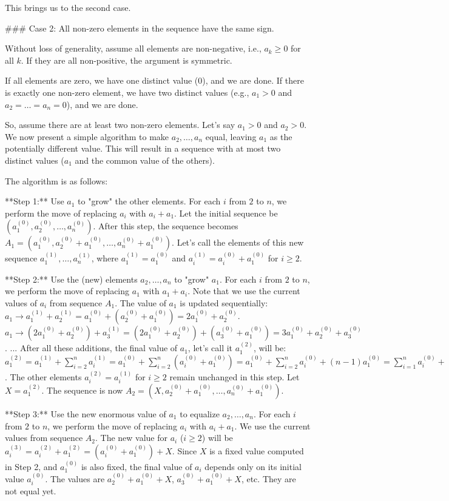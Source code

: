 This brings us to the second case.

### Case 2: All non-zero elements in the sequence have the same sign.

Without loss of generality, assume all elements are non-negative, i.e., $a_k \ge 0$ for all $k$. If they are all non-positive, the argument is symmetric.

If all elements are zero, we have one distinct value (0), and we are done.
If there is exactly one non-zero element, we have two distinct values (e.g., $a_1 > 0$ and $a_2=\dots=a_n=0$), and we are done.

So, assume there are at least two non-zero elements. Let's say $a_1 > 0$ and $a_2 > 0$. We now present a simple algorithm to make $a_2, \dots, a_n$ equal, leaving $a_1$ as the potentially different value. This will result in a sequence with at most two distinct values ($a_1$ and the common value of the others).

The algorithm is as follows:

**Step 1:** Use $a_1$ to "grow" the other elements.
For each $i$ from $2$ to $n$, we perform the move of replacing $a_i$ with $a_i+a_1$.
Let the initial sequence be $(a_1^{(0)}, a_2^{(0)}, \dots, a_n^{(0)})$.
After this step, the sequence becomes $A_1 = (a_1^{(0)}, a_2^{(0)}+a_1^{(0)}, \dots, a_n^{(0)}+a_1^{(0)})$. Let's call the elements of this new sequence $a_1^{(1)}, \dots, a_n^{(1)}$, where $a_1^{(1)}=a_1^{(0)}$ and $a_i^{(1)}=a_i^{(0)}+a_1^{(0)}$ for $i \ge 2$.

**Step 2:** Use the (new) elements $a_2, \dots, a_n$ to "grow" $a_1$.
For each $i$ from $2$ to $n$, we perform the move of replacing $a_1$ with $a_1+a_i$. Note that we use the current values of $a_i$ from sequence $A_1$.
The value of $a_1$ is updated sequentially:
$a_1 \to a_1^{(1)} + a_2^{(1)} = a_1^{(0)} + (a_2^{(0)}+a_1^{(0)}) = 2a_1^{(0)}+a_2^{(0)}$.
$a_1 \to (2a_1^{(0)}+a_2^{(0)}) + a_3^{(1)} = (2a_1^{(0)}+a_2^{(0)}) + (a_3^{(0)}+a_1^{(0)}) = 3a_1^{(0)}+a_2^{(0)}+a_3^{(0)}$.
...
After all these additions, the final value of $a_1$, let's call it $a_1^{(2)}$, will be:
$a_1^{(2)} = a_1^{(1)} + \sum_{i=2}^n a_i^{(1)} = a_1^{(0)} + \sum_{i=2}^n (a_i^{(0)} + a_1^{(0)}) = a_1^{(0)} + \sum_{i=2}^n a_i^{(0)} + (n-1)a_1^{(0)} = \sum_{i=1}^n a_i^{(0)} + (n-1)a_1^{(0)}$.
The other elements $a_i^{(2)} = a_i^{(1)}$ for $i \ge 2$ remain unchanged in this step.
Let $X = a_1^{(2)}$. The sequence is now $A_2 = (X, a_2^{(0)}+a_1^{(0)}, \dots, a_n^{(0)}+a_1^{(0)})$.

**Step 3:** Use the new enormous value of $a_1$ to equalize $a_2, \dots, a_n$.
For each $i$ from $2$ to $n$, we perform the move of replacing $a_i$ with $a_i+a_1$. We use the current values from sequence $A_2$.
The new value for $a_i$ ($i \ge 2$) will be $a_i^{(3)} = a_i^{(2)} + a_1^{(2)} = (a_i^{(0)}+a_1^{(0)}) + X$.
Since $X$ is a fixed value computed in Step 2, and $a_1^{(0)}$ is also fixed, the final value of $a_i$ depends only on its initial value $a_i^{(0)}$.
The values are $a_2^{(0)}+a_1^{(0)}+X$, $a_3^{(0)}+a_1^{(0)}+X$, etc. They are not equal yet.


